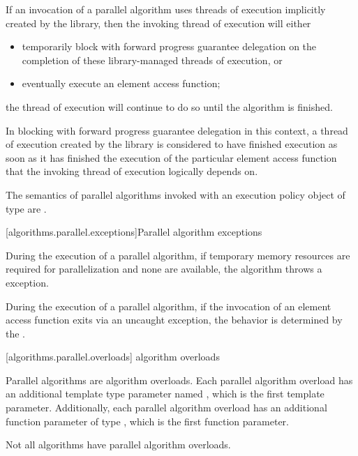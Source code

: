 \pnum
If an invocation of a parallel algorithm uses threads of execution
implicitly created by the library,
then the invoking thread of execution will either
\begin{itemize}
\item
  temporarily block
  with forward progress guarantee delegation
  on the completion of these library-managed threads of execution, or
\item
  eventually execute an element access function;
\end{itemize}
the thread of execution will continue to do so until the algorithm is finished.
\begin{note}
In blocking with forward progress guarantee delegation in this context,
a thread of execution created by the library
is considered to have finished execution
as soon as it has finished the execution
of the particular element access function
that the invoking thread of execution logically depends on.
\end{note}

\pnum
The semantics of parallel algorithms invoked with an execution policy object of
 type
are .

[algorithms.parallel.exceptions]{Parallel algorithm exceptions}

\pnum
During the execution of a parallel algorithm,
if temporary memory resources are required for parallelization
and none are available, the algorithm throws a  exception.

\pnum
During the execution of a parallel algorithm,
if the invocation of an element access function exits via an uncaught exception,
the behavior is determined by the .

[algorithms.parallel.overloads]{ algorithm overloads}

\pnum
Parallel algorithms are algorithm overloads.
Each parallel algorithm overload
has an additional template type parameter named ,
which is the first template parameter.
Additionally, each parallel algorithm overload
has an additional function parameter of type ,
which is the first function parameter.
\begin{note}
Not all algorithms have parallel algorithm overloads.
\end{note}

